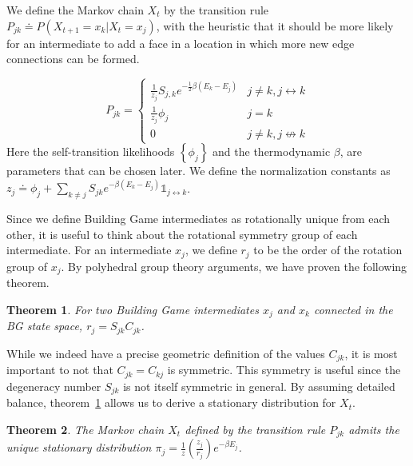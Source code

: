 \documentclass[12pt]{article}
\newtheorem{mythm}{Theorem}
\begin{document}
We define the Markov chain $X_t$ by the transition rule $P_{jk} \doteq P(X_{t+1} = x_k | X_t = x_j)$, with the heuristic that it should be more likely for an intermediate to add a face in a location in which more new edge connections can be formed.


$$
 P_{jk} = \begin{cases}
        \frac{1}{z_j}S_{j,k}e^{-\frac{1}{2}\beta\left(E_k-E_j\right)}  & j \neq k, j \leftrightarrow k \\
        \frac{1}{z_j}\phi_j \label{eq:A} & j = k\\
        0 & j \neq k, j \not\leftrightarrow k 
       \end{cases}
$$
Here the self-transition likelihoods $\left\{\phi_j\right\}$ and the thermodynamic $\beta$, are parameters that can be chosen later. We define the normalization constants as $z_j \doteq \phi_j + \sum_{k\neq j}S_{jk}e^{-\beta\left(E_k-E_j\right)}\mathbb{1}_{j\leftrightarrow k}$. 


Since we define Building Game intermediates as rotationally unique from each other, it is useful to think about the rotational symmetry group of each intermediate. For an intermediate $x_j$, we define $r_j$ to be the order of the rotation group of $x_j$. By polyhedral group theory arguments, we have proven the following theorem.
\begin{mythm}
\label{thm:C}
For two Building Game intermediates $x_j$ and $x_k$ connected in the BG state space, $r_j = S_{jk}C_{jk}$.
\end{mythm}
While we indeed have a precise geometric definition of the values $C_{jk}$, it is most important to not that $C_{jk} = C_{kj}$ is symmetric. This symmetry is useful since the degeneracy number $S_{jk}$ is not itself symmetric in general. By assuming detailed balance, theorem~\ref{thm:C} allows us to derive a stationary distribution for $X_t$.
\begin{mythm}
The Markov chain $X_t$ defined by the transition rule $P_{jk}$ admits the unique stationary distribution $\pi_j = \frac{1}{z}\left(\frac{z_j}{r_j}\right)e^{-\beta E_j}$. 
\end{mythm}
\end{document}
